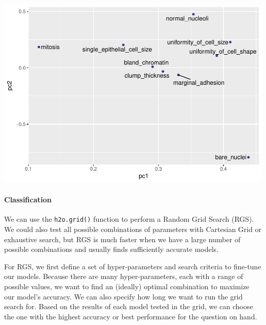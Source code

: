 \documentclass[]{article}
\newenvironment{Shaded}{\begin{snugshade}}{\end{snugshade}}
\newcommand{\KeywordTok}[1]{\textcolor[rgb]{0.13,0.29,0.53}{\textbf{{#1}}}}
\newcommand{\DataTypeTok}[1]{\textcolor[rgb]{0.13,0.29,0.53}{{#1}}}
\newcommand{\FloatTok}[1]{\textcolor[rgb]{0.00,0.00,0.81}{{#1}}}
\newcommand{\StringTok}[1]{\textcolor[rgb]{0.31,0.60,0.02}{{#1}}}
\newcommand{\NormalTok}[1]{{#1}}
\let\oldparagraph\paragraph
\renewcommand{\paragraph}[1]{\oldparagraph{#1}\mbox{}}
\begin{document}
\begin{Shaded}
\end{Shaded}

\includegraphics{webinar_code_files/figure-latex/pca_features-1.pdf}

\paragraph{Classification}\label{classification-1}

We can use the \texttt{h2o.grid()} function to perform a Random Grid
Search (RGS). We could also test all possible combinations of parameters
with Cartesian Grid or exhaustive search, but RGS is much faster when we
have a large number of possible combinations and usually finds
sufficiently accurate models.

For RGS, we first define a set of hyper-parameters and search criteria
to fine-tune our models. Because there are many hyper-parameters, each
with a range of possible values, we want to find an (ideally) optimal
combination to maximize our model's accuracy. We can also specify how
long we want to run the grid search for. Based on the results of each
model tested in the grid, we can choose the one with the highest
accuracy or best performance for the question on hand.
\end{document}
